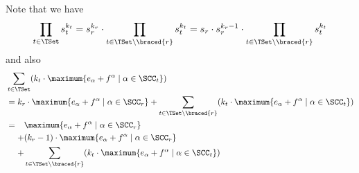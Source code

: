 Note that we have
\[ \prod_{t \in \TSet} s^{k_t}_t = s^{k_r}_r \cdot \prod_{t \in \TSet \setminus \braced{r}} s^{k_t}_t = s_r \cdot s^{k_r - 1}_r \cdot \prod_{t \in \TSet \setminus \braced{r}} s^{k_t}_t \]
and also
\begin{align*}
  & \sum_{t \in \TSet} (k_t \cdot \maximum{e_\alpha + f^\alpha \mid \alpha \in \SCC_t}) \\
  & = k_r \cdot \maximum{e_\alpha + f^\alpha \mid \alpha \in \SCC_r} + \sum_{t \in \TSet \setminus \braced{r}} (k_t \cdot \maximum{e_\alpha + f^\alpha \mid \alpha \in \SCC_t}) \\
  & =
  \begin{aligned}[t]
    & \maximum{e_\alpha + f^\alpha \mid \alpha \in \SCC_r} \\
    + & (k_r - 1) \cdot \maximum{e_\alpha + f^\alpha \mid \alpha \in \SCC_r} \\
    + & \sum_{t \in \TSet \setminus \braced{r}} (k_t \cdot \maximum{e_\alpha + f^\alpha \mid \alpha \in \SCC_t})
  \end{aligned}
\end{align*}

